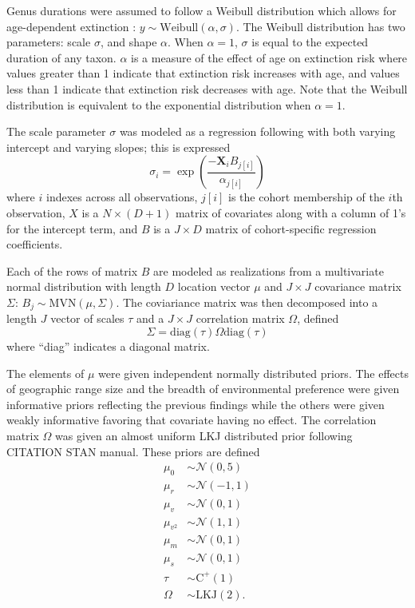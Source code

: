 \documentclass{article}
\begin{document}
Genus durations were assumed to follow a Weibull distribution which allows for age-dependent extinction \citep{Klein2003}: \(y \sim \mathrm{Weibull}(\alpha, \sigma)\). The Weibull distribution has two parameters: scale \(\sigma\), and shape \(\alpha\). When \(\alpha = 1\), \(\sigma\) is equal to the expected duration of any taxon. \(\alpha\) is a measure of the effect of age on extinction risk where values greater than 1 indicate that extinction risk increases with age, and values less than 1 indicate that extinction risk decreases with age. Note that the Weibull distribution is equivalent to the exponential distribution when \(\alpha = 1\). 

The scale parameter \(\sigma\) was modeled as a regression following \citet{Kleinbaum2005} with both varying intercept and varying slopes; this is expressed
\begin{equation}
  \sigma_{i} = \exp\left(\frac{-\mathbf{X}_{i} B_{j[i]}}{\alpha_{j[i]}}\right)
  \label{eq:sigma}
\end{equation}
where \(i\) indexes across all observations, \(j[i]\) is the cohort membership of the \(i\)th observation, \(X\) is a \(N \times (D + 1)\) matrix of covariates along with a column of 1's for the intercept term, and \(B\) is a \(J \times D\) matrix of cohort-specific regression coefficients.

Each of the rows of matrix \(B\) are modeled as realizations from a multivariate normal distribution with length \(D\) location vector \(\mu\) and \(J \times J\) covariance matrix \(\Sigma\): \(B_{j} \sim \mathrm{MVN}(\mu, \Sigma)\). The coviariance matrix was then decomposed into a length \(J\) vector of scales \(\tau\) and a \(J \times J\) correlation matrix \(\Omega\), defined
\begin{equation}
  \Sigma = \mathrm{diag}(\tau) \Omega \mathrm{diag}(\tau)
\end{equation}
where ``diag'' indicates a diagonal matrix.

The elements of \(\mu\) were given independent normally distributed priors. The effects of geographic range size  and the breadth of environmental preference were given informative priors reflecting the previous findings while the others were given weakly informative favoring that covariate having no effect. The correlation matrix \(\Omega\) was given an almost uniform LKJ distributed prior following CITATION STAN manual. These priors are defined
\begin{equation}
  \begin{aligned}
    \mu_{0} &\sim \mathcal{N}(0, 5) \\
    \mu_{r} &\sim \mathcal{N}(-1, 1) \\
    \mu_{v} &\sim \mathcal{N}(0, 1) \\
    \mu_{v^{2}} &\sim \mathcal{N}(1, 1) \\
    \mu_{m} &\sim \mathcal{N}(0, 1) \\
    \mu_{s} &\sim \mathcal{N}(0, 1) \\
    \tau &\sim \mathrm{C^{+}}(1) \\
    \Omega &\sim \text{LKJ}(2).
  \end{aligned}
  \label{eq:sigma_prior}
\end{equation}
\end{document}
